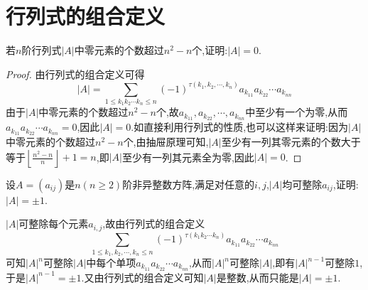 \documentclass[../../main.tex]{subfiles}%
\begin{document}
\section{行列式的组合定义}

\begin{example}
若\(n\)阶行列式\(\vert A\vert\)中零元素的个数超过\(n^2 - n\)个,证明:\(\vert A\vert = 0\).
\end{example}
\begin{proof}

由行列式的组合定义可得
\[
|A|=\sum_{1\leqslant  k_1k_2\cdots k_n\leqslant  n}(-1)^{\tau (k_1,k_2,\cdots,k_n)}a_{k_{11}}a_{k_{22}}\cdots a_{k_{nn}}
\]
由于\(|A|\)中零元素的个数超过\(n^2 - n\)个,故\(a_{k_{11}},a_{k_{22}},\cdots,a_{k_{nn}}\)中至少有一个为零,从而\(a_{k_{11}}a_{k_{22}}\cdots a_{k_{nn}} = 0\),因此\(|A| = 0\).如直接利用行列式的性质,也可以这样来证明:因为\(|A|\)中零元素的个数超过\(n^2 - n\)个,由抽屉原理可知,\(|A|\)至少有一列其零元素的个数大于等于\(\left\lfloor\frac{n^2 - n}{n}\right\rfloor+ 1=n\),即\(|A|\)至少有一列其元素全为零,因此\(|A| = 0\).

\end{proof}

\begin{example}
设\(A=(a_{ij})\)是\(n(n\geqslant 2)\)阶非异整数方阵,满足对任意的\(i,j\),\(\vert A\vert\)均可整除\(a_{ij}\),证明:\(\vert A\vert=\pm1\).
\end{example}
\begin{solution}

\(\vert A\vert\)可整除每个元素\(a_{i,j}\),故由行列式的组合定义
\[
\sum_{1\leqslant k_1,k_2,\cdots ,k_n\leqslant n}{\left( -1 \right) ^{\tau \left( k_1k_2\cdots k_n \right)}a_{k_{11}}a_{k_{22}}\cdots a_{k_{nn}}}
\]
可知\(\vert A\vert^n\)可整除\(\vert A\vert\)中每个单项\(a_{k_{11}}a_{k_{22}}\cdots a_{k_{nn}}\),从而\(\vert A\vert^n\)可整除\(\vert A\vert\),即有\(\vert A\vert^{n - 1}\)可整除\(1\),于是\(\vert A\vert^{n - 1}=\pm1\).又由行列式的组合定义可知\(\vert A\vert\)是整数,从而只能是\(\vert A\vert=\pm1\).

\end{solution}
\end{document}
